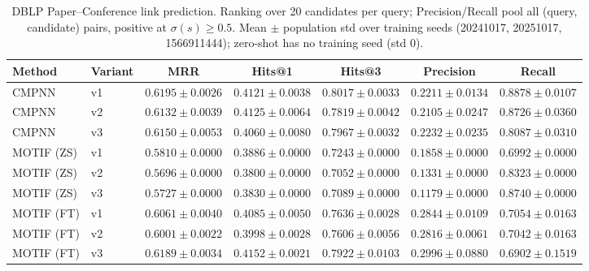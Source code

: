 \begin{table}[t]
\centering
\small
\begin{tabular}{||l||l||c|c|c||c|c||}
\hline
\textbf{Method} & \textbf{Variant} & \textbf{MRR} & \textbf{Hits@1} & \textbf{Hits@3} & \textbf{Precision} & \textbf{Recall} \\
\hline\hline
CMPNN & v1 & $0.6195 \pm 0.0026$ & $0.4121 \pm 0.0038$ & $0.8017 \pm 0.0033$ & $0.2211 \pm 0.0134$ & $0.8878 \pm 0.0107$ \\
\hline
CMPNN & v2 & $0.6132 \pm 0.0039$ & $0.4125 \pm 0.0064$ & $0.7819 \pm 0.0042$ & $0.2105 \pm 0.0247$ & $0.8726 \pm 0.0360$ \\
\hline
CMPNN & v3 & $0.6150 \pm 0.0053$ & $0.4060 \pm 0.0080$ & $0.7967 \pm 0.0032$ & $0.2232 \pm 0.0235$ & $0.8087 \pm 0.0310$ \\
\hline
\hline
MOTIF (ZS) & v1 & $0.5810 \pm 0.0000$ & $0.3886 \pm 0.0000$ & $0.7243 \pm 0.0000$ & $0.1858 \pm 0.0000$ & $0.6992 \pm 0.0000$ \\
\hline
MOTIF (ZS) & v2 & $0.5696 \pm 0.0000$ & $0.3800 \pm 0.0000$ & $0.7052 \pm 0.0000$ & $0.1331 \pm 0.0000$ & $0.8323 \pm 0.0000$ \\
\hline
MOTIF (ZS) & v3 & $0.5727 \pm 0.0000$ & $0.3830 \pm 0.0000$ & $0.7089 \pm 0.0000$ & $0.1179 \pm 0.0000$ & $0.8740 \pm 0.0000$ \\
\hline
\hline
MOTIF (FT) & v1 & $0.6061 \pm 0.0040$ & $0.4085 \pm 0.0050$ & $0.7636 \pm 0.0028$ & $0.2844 \pm 0.0109$ & $0.7054 \pm 0.0163$ \\
\hline
MOTIF (FT) & v2 & $0.6001 \pm 0.0022$ & $0.3998 \pm 0.0028$ & $0.7606 \pm 0.0056$ & $0.2816 \pm 0.0061$ & $0.7042 \pm 0.0163$ \\
\hline
MOTIF (FT) & v3 & $0.6189 \pm 0.0034$ & $0.4152 \pm 0.0021$ & $0.7922 \pm 0.0103$ & $0.2996 \pm 0.0880$ & $0.6902 \pm 0.1519$ \\
\hline
\end{tabular}
\caption{DBLP Paper--Conference link prediction. Ranking over 20 candidates per query; Precision/Recall pool all (query, candidate) pairs, positive at $\sigma(s) \geq 0.5$. Mean $\pm$ population std over training seeds (20241017, 20251017, 1566911444); zero-shot has no training seed (std 0). }
\label{tab:dblp_paper_conference_seed_performance}
\end{table}
